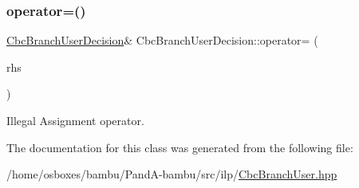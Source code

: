\subsubsection{\texorpdfstring{operator=()}{operator=()}}
{\footnotesize\ttfamily \hyperlink{classCbcBranchUserDecision}{Cbc\+Branch\+User\+Decision}\& Cbc\+Branch\+User\+Decision\+::operator= (\begin{DoxyParamCaption}\item[{const \hyperlink{classCbcBranchUserDecision}{Cbc\+Branch\+User\+Decision} \&}]{rhs }\end{DoxyParamCaption})\hspace{0.3cm}{\ttfamily [private]}}



Illegal Assignment operator. 



The documentation for this class was generated from the following file\+:\begin{DoxyCompactItemize}
\item 
/home/osboxes/bambu/\+Pand\+A-\/bambu/src/ilp/\hyperlink{CbcBranchUser_8hpp}{Cbc\+Branch\+User.\+hpp}\end{DoxyCompactItemize}
